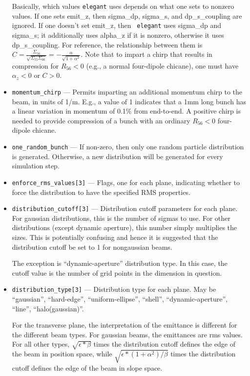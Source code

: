 \documentclass[11pt]{article}
\begin{document}
\begin{itemize}
Basically, which values {\tt elegant} uses depends on what one sets to
nonzero values.  If one sets emit\_z, then sigma\_dp, sigma\_s, and
dp\_s\_coupling are ignored.  If one doesn't set emit\_z, then {\tt
elegant} uses sigma\_dp and sigma\_s; it additionally uses alpha\_z if
it is nonzero, otherwise it uses dp\_s\_coupling.  For reference, the
relationship between them is $ C =
\frac{\Sigma_{56}}{\sqrt{\Sigma_{55}\Sigma_{66}}} =
-\frac{\alpha}{\sqrt{1+\alpha^2}}$.  Note that to impart a chirp that
results in compression for $R_{56}<0$ (e.g., a normal four-dipole
chicane), one must have $\alpha_z<0$ or $C>0$.

\item \verb|momentum_chirp| --- Permits imparting an additional
momentum chirp to the beam, in units of 1/m.  E.g., a value of 1
indicates that a 1mm long bunch has a linear variation in momentum of
0.1\% from end-to-end.  A positive chirp is needed to provide
compression of a bunch with an ordinary $R_{56}<0$ four-dipole
chicane.

\item \verb|one_random_bunch| --- If non-zero, then only one random
particle distribution is generated.  Otherwise, a new distribution
will be generated for every simulation step.

\item \verb|enforce_rms_values[3]| --- Flags, one for each plane,
indicating whether to force the distribution to have the specified RMS
properties.

\item \verb|distribution_cutoff[3]| --- Distribution cutoff parameters
for each plane.  For gaussian distributions, this is the number of
sigmas to use.  For other distributions (except dynamic aperture),
this number simply multiplies the sizes.  This is potentially
confusing and hence it is suggested that the distribution cutoff be
set to 1 for nongaussian beams.

The exception is ``dynamic-aperture'' distribution type.  In this case,
the cutoff value is the number of grid points in the dimension in question.

\item \verb|distribution_type[3]| --- Distribution type for each
plane.  May be ``gaussian'', ``hard-edge'', ``uniform-ellipse'',
``shell'', ``dynamic-aperture'', ``line'', ``halo(gaussian)''.

For the transverse plane, the interpretation of the emittance is
different for the different beam types.  For gaussian beams, the
emittances are rms values.  For all other types, $\sqrt{\epsilon*\beta}$
times the distribution cutoff defines the edge of the beam in position
space, while $\sqrt{\epsilon*(1+\alpha^2)/\beta}$ times the distribution
cutoff defines the edge of the beam in slope space.  


\end{itemize}
\end{document}
